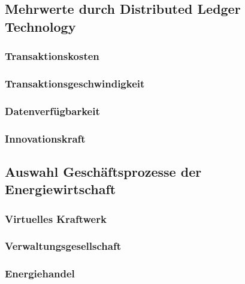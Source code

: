 \subsection{Mehrwerte durch Distributed Ledger Technology}

\subsubsection{Transaktionskosten}

\subsubsection{Transaktionsgeschwindigkeit}

\subsubsection{Datenverfügbarkeit}

\subsubsection{Innovationskraft}

\subsection{Auswahl Geschäftsprozesse der Energiewirtschaft}

\subsubsection{Virtuelles Kraftwerk}

\subsubsection{Verwaltungsgesellschaft}

\subsubsection{Energiehandel}

\newpage